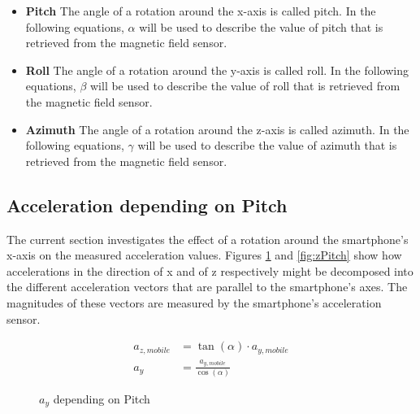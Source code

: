 \documentclass[12pt, a4paper, oneside, british]{article}
\begin{document}
\begin{itemize}
\item{
\textbf{Pitch} \newline
The angle of a rotation around the x-axis is called pitch. In the following
equations, $\alpha$ will be used to describe the value of pitch that is
retrieved from the magnetic field sensor.
}
\item{
\textbf{Roll} \newline
The angle of a rotation around the y-axis is called roll. In the following
equations, $\beta$ will be used to describe the value of roll that is retrieved
from the magnetic field sensor.
}
\item{
\textbf{Azimuth} \newline
The angle of a rotation around the z-axis is called azimuth. In the following
equations, $\gamma$ will be used to describe the value of azimuth that is
retrieved from the magnetic field sensor.
}
\end{itemize}


\subsection{Acceleration depending on Pitch}
The current section investigates the effect of a rotation around the
smartphone's x-axis on the measured acceleration values. Figures
\ref{fig:yPitch} and \ref{fig:zPitch} show how accelerations in the direction of
x and of z respectively might be decomposed into the different
acceleration vectors that are parallel to the smartphone's axes. The 
magnitudes of these vectors are measured by the smartphone's acceleration
sensor.

\begin{figure}[htb]
    \centering
    \begin{minipage}{0.5\textwidth}
        \centering
        \captionsetup{justification=centering}
        
        \caption{$a_y$ depending on Pitch}
        \label{fig:yPitch}
    \end{minipage}%
    \hfill
    \begin{minipage}{0.5\textwidth}
        \centering
			\begin{align} 
				a_{z, mobile} &= \tan(\alpha) \cdot {a_{y, mobile}}\\
				a_y &= \frac{a_{y, mobile}}{\cos(\alpha)}
			\end{align}
    \end{minipage}
\end{figure}
\end{document}
